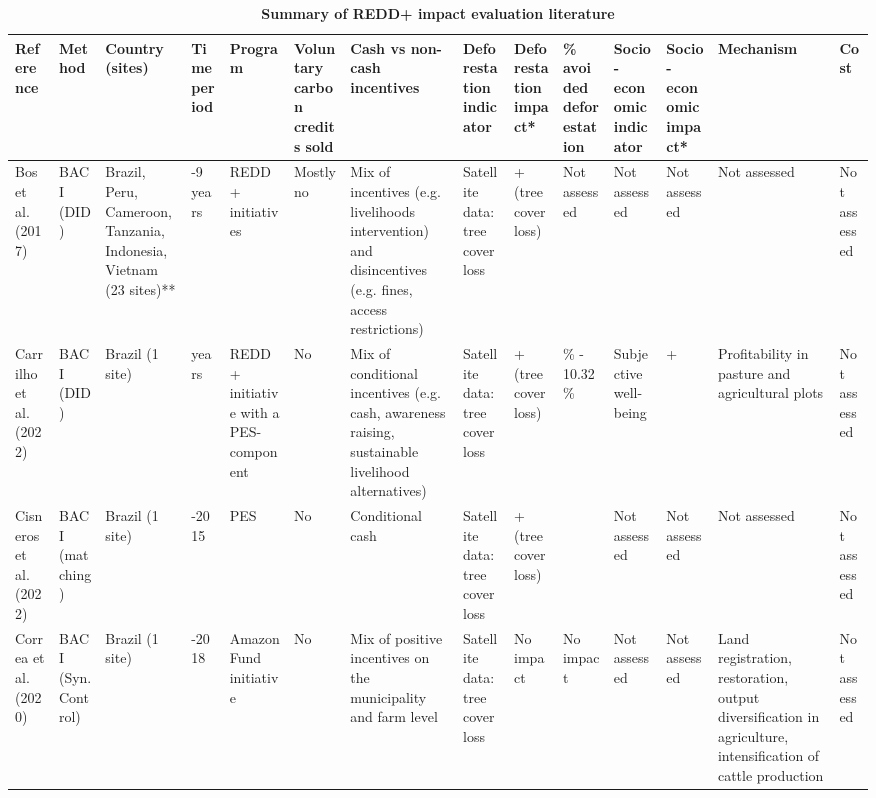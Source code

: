 \documentclass[
]{article}
\begin{document}
\clearpage
\begin{landscape}
\begin{table}[!h]

\caption{\label{tab:tablelit}\textbf{Summary of REDD+ impact evaluation literature}}
\centering
\fontsize{5}{7}\selectfont
\begin{threeparttable}
\begin{tabular}[t]{>{\raggedright\arraybackslash}p{4em}|>{\raggedright\arraybackslash}p{4em}|>{\raggedright\arraybackslash}p{5em}|>{\raggedright\arraybackslash}p{4em}|>{\raggedright\arraybackslash}p{4em}|>{\raggedright\arraybackslash}p{4em}|>{\raggedright\arraybackslash}p{6em}|>{\raggedright\arraybackslash}p{6em}|>{\raggedright\arraybackslash}p{6em}|>{\raggedright\arraybackslash}p{5em}|>{\raggedright\arraybackslash}p{5em}|>{\raggedright\arraybackslash}p{5em}|>{\raggedright\arraybackslash}p{5em}|>{\raggedright\arraybackslash}p{4em}}
\hline
\textbf{Reference} & \textbf{Method} & \textbf{Country (sites)} & \textbf{Time period} & \textbf{Program} & \textbf{Voluntary carbon credits sold} & \textbf{Cash vs non-cash incentives} & \textbf{Deforestation indicator} & \textbf{Deforestation impact*} & \textbf{\% avoided deforestation} & \textbf{Socio- economic indicator} & \textbf{Socio- economic impact*} & \textbf{Mechanism} & \textbf{Cost}\\
\hline
Bos et al. (2017) & BACI (DID) & Brazil, Peru, Cameroon, Tanzania, Indonesia, Vietnam (23 sites)** & 2-9 years & REDD+ initiatives & Mostly no & Mix of incentives (e.g. livelihoods intervention) and disincentives (e.g. fines, access restrictions) & Satellite data: tree cover loss & + (tree cover loss) & Not assessed & Not assessed & Not assessed & Not assessed & Not assessed\\
Carrilho et al. (2022) & BACI (DID) & Brazil (1 site) & 2 years & REDD+ initiative with a PES-component & No & Mix of conditional incentives (e.g. cash, awareness raising, sustainable livelihood alternatives) & Satellite data: tree cover loss & + (tree cover loss) & 7.80\% - 10.32\% & Subjective well-being & + & Profitability in pasture and agricultural plots & Not assessed\\
Cisneros et al. (2022) & BACI (matching) & Brazil (1 site) & 2008-2015 & PES & No & Conditional cash & Satellite data: tree cover loss & + (tree cover loss) & 0.1 & Not assessed & Not assessed & Not assessed & Not assessed\\
Correa et al. (2020) & BACI (Syn. Control) & Brazil (1 site) & 2011-2018 & Amazon Fund initiative & No & Mix of positive incentives on the municipality and farm level & Satellite data: tree cover loss & No impact & No impact & Not assessed & Not assessed & Land registration, restoration, output diversification in agriculture, intensification of cattle production & Not assessed\\

\end{tabular}
\end{threeparttable}
\end{table}
\end{landscape}
\end{document}
